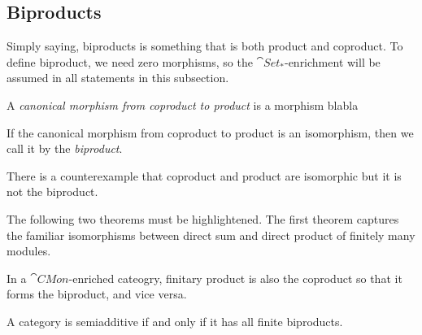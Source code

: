 \documentclass{../exp}
\begin{document}
\subsection{Biproducts}
Simply saying, biproducts is something that is both product and coproduct.
To define biproduct, we need zero morphisms, so the $\cat{Set_*}$-enrichment will be assumed in all statements in this subsection.
\begin{defn}
A \emph{canonical morphism from coproduct to product} is a morphism blabla
\end{defn}
\begin{defn}[Biproduct]
If the canonical morphism from coproduct to product is an isomorphism, then we call it by the \emph{biproduct}.
\end{defn}
There is a counterexample that coproduct and product are isomorphic but it is not the biproduct.




The following two theorems must be highlightened.
The first theorem captures the familiar isomorphisms between direct sum and direct product of finitely many modules.
\begin{thm}
In a $\cat{CMon}$-enriched cateogry, finitary product is also the coproduct so that it forms the biproduct, and vice versa.
\end{thm}

\begin{thm}
A category is semiadditive if and only if it has all finite biproducts.
\end{thm}
\end{document}
